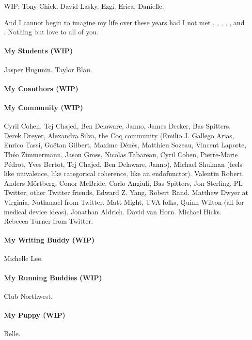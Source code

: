 \documentclass[ twoside,openright,titlepage,numbers=noenddot,headinclude,
                footinclude=true,cleardoublepage=empty,abstractoff,%
                BCOR=5mm,paper=letter,fontsize=11pt,letterpaper,%
                american,%
                ]{scrreprt}
\begin{document}
WIP: Tony Chick. David Lasky. Ezgi. Erica. Danielle.

And I cannot begin to imagine my life over these years had I not met
, , , , ,
and . %
Nothing but love to all of you.

\paragraph{My Students (WIP)}
Jasper Hugunin.
Taylor Blau.

\paragraph{My Coauthors (WIP)}

\paragraph{My Community (WIP)}
Cyril Cohen, Tej Chajed, Ben Delaware, Janno,
James Decker, Bas Spitters,
Derek Dreyer,
Alexandra Silva,
the Coq community (Emilio J. Gallego Arias, Enrico Tassi, Ga\"{e}tan Gilbert, Maxime D\'{e}n\`{e}s,
Matthieu Sozeau, Vincent Laporte, Th\'{e}o Zimmermann, Jason Gross, Nicolas Tabareau, Cyril Cohen, Pierre-Marie P\'{e}drot, Yves Bertot, Tej Chajed, Ben Delaware, Janno),
Michael Shulman (feels like univalence, like categorical coherence, like an endofunctor).
Valentin Robert.
Anders M\"ortberg, Conor McBride, Carlo Angiuli, Bas Spitters, Jon Sterling,
PL Twitter, other Twitter friends,
Edward Z. Yang, Robert Rand.
Matthew Dwyer at Virginia, Nathanael from Twitter, Matt Might, UVA folks, Quinn Wilton (all for medical device ideas).
Jonathan Aldrich.
David van Horn.
Michael Hicks. %
Rebecca Turner from Twitter.

\paragraph{My Writing Buddy (WIP)}
Michelle Lee.

\paragraph{My Running Buddies (WIP)}
Club Northwest.

\paragraph{My Puppy (WIP)}
Belle.
\end{document}
